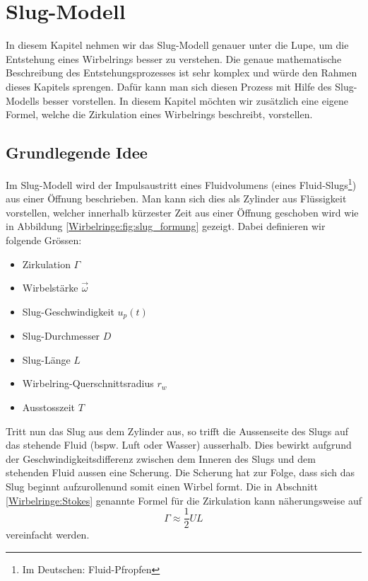 %
%
%
\section{Slug-Modell}
In diesem Kapitel nehmen wir das Slug-Modell genauer unter die Lupe, um die Entstehung eines Wirbelrings besser zu verstehen.
Die genaue mathematische Beschreibung des Entstehungsprozesses ist sehr komplex und würde den Rahmen dieses Kapitels sprengen.
Dafür kann man sich diesen Prozess mit Hilfe des Slug-Modells besser vorstellen.
In diesem Kapitel möchten wir zusätzlich eine eigene Formel, welche die Zirkulation eines Wirbelrings beschreibt, vorstellen.

\subsection{Grundlegende Idee}
Im Slug-Modell wird der Impulsaustritt eines Fluidvolumens (eines Fluid-Slugs\footnote{Im Deutschen: Fluid-Pfropfen}) aus einer Öffnung beschrieben.
Man kann sich dies als Zylinder aus Flüssigkeit vorstellen, welcher innerhalb kürzester Zeit aus einer Öffnung geschoben wird wie in Abbildung \ref{Wirbelringe:fig:slug_formung} gezeigt.
Dabei definieren wir folgende Grössen:
\begin{itemize}
    \item Zirkulation \(\Gamma\)
    \item Wirbelstärke \(\vec{\omega}\)
    \item Slug-Geschwindigkeit \(u_p(t)\)
    \item Slug-Durchmesser \(D\)
    \item Slug-Länge \(L\)
    \item Wirbelring-Querschnittsradius \(r_w\)
    \item Ausstosszeit \(T\)
\end{itemize}



Tritt nun das Slug aus dem Zylinder aus, so trifft die Aussenseite des Slugs auf das stehende Fluid (bspw. Luft oder Wasser) ausserhalb.
Dies bewirkt aufgrund der Geschwindigkeitsdifferenz zwischen dem Inneren des Slugs und dem stehenden Fluid aussen eine Scherung.
Die Scherung hat zur Folge, dass sich das Slug beginnt \glqq aufzurollen\grqq und somit einen Wirbel formt. 
Die in Abschnitt \ref{Wirbelringe:Stokes} genannte Formel für die Zirkulation kann näherungsweise auf
\begin{equation*}
\Gamma 
\approx 
\frac{1}{2}UL
\end{equation*}
vereinfacht werden.

